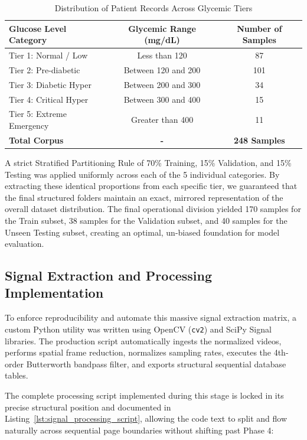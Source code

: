 \begin{table}[H]
\centering
\caption{Distribution of Patient Records Across Glycemic Tiers}
\label{tab:glucose_distribution}
\vspace{0.5em}
\begin{tabular}{|l|c|c|}
\hline
\textbf{Glucose Level Category} & \textbf{Glycemic Range (mg/dL)} & \textbf{Number of Samples} \\ \hline
Tier 1: Normal / Low & Less than 120 & 87 \\ \hline
Tier 2: Pre-diabetic & Between 120 and 200 & 101 \\ \hline
Tier 3: Diabetic Hyper & Between 200 and 300 & 34 \\ \hline
Tier 4: Critical Hyper & Between 300 and 400 & 15 \\ \hline
Tier 5: Extreme Emergency & Greater than 400 & 11 \\ \hline
\textbf{Total Corpus} & \textbf{-} & \textbf{248 Samples} \\ \hline
\end{tabular}
\end{table}

A strict Stratified Partitioning Rule of 70\% Training, 15\% Validation, and 15\% Testing was applied uniformly across each of the 5 individual categories. By extracting these identical proportions from each specific tier, we guaranteed that the final structured folders maintain an exact, mirrored representation of the overall dataset distribution. The final operational division yielded 170 samples for the Train subset, 38 samples for the Validation subset, and 40 samples for the Unseen Testing subset, creating an optimal, un-biased foundation for model evaluation.

\subsection{Signal Extraction and Processing Implementation}
To enforce reproducibility and automate this massive signal extraction matrix, a custom Python utility was written using OpenCV (\texttt{cv2}) and SciPy Signal libraries. The production script automatically ingests the normalized videos, performs spatial frame reduction, normalizes sampling rates, executes the 4th-order Butterworth bandpass filter, and exports structural sequential database tables. 

The complete processing script implemented during this stage is locked in its precise structural position and documented in Listing~\ref{lst:signal_processing_script}, allowing the code text to split and flow naturally across sequential page boundaries without shifting past Phase 4:

